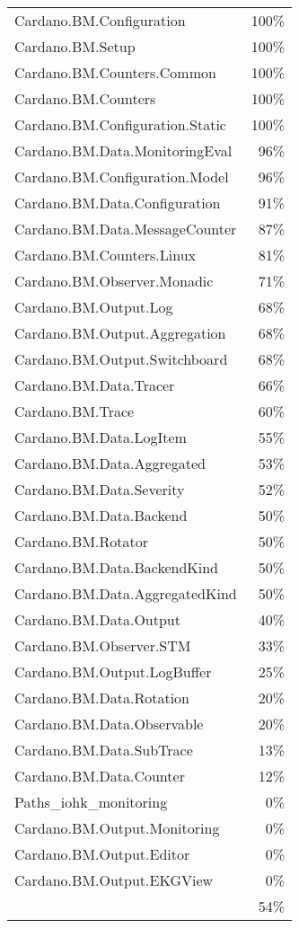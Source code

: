 \begin{tabular}{l r}
   Cardano.BM.Configuration & 100\% \\
   Cardano.BM.Setup & 100\% \\
   Cardano.BM.Counters.Common & 100\% \\
   Cardano.BM.Counters & 100\% \\
   Cardano.BM.Configuration.Static & 100\% \\
   Cardano.BM.Data.MonitoringEval & 96\% \\
   Cardano.BM.Configuration.Model & 96\% \\
   Cardano.BM.Data.Configuration & 91\% \\
   Cardano.BM.Data.MessageCounter & 87\% \\
   Cardano.BM.Counters.Linux & 81\% \\
   Cardano.BM.Observer.Monadic & 71\% \\
   Cardano.BM.Output.Log & 68\% \\
   Cardano.BM.Output.Aggregation & 68\% \\
   Cardano.BM.Output.Switchboard & 68\% \\
   Cardano.BM.Data.Tracer & 66\% \\
   Cardano.BM.Trace & 60\% \\
   Cardano.BM.Data.LogItem & 55\% \\
   Cardano.BM.Data.Aggregated & 53\% \\
   Cardano.BM.Data.Severity & 52\% \\
   Cardano.BM.Data.Backend & 50\% \\
   Cardano.BM.Rotator & 50\% \\
   Cardano.BM.Data.BackendKind & 50\% \\
   Cardano.BM.Data.AggregatedKind & 50\% \\
   Cardano.BM.Data.Output & 40\% \\
   Cardano.BM.Observer.STM & 33\% \\
   Cardano.BM.Output.LogBuffer & 25\% \\
   Cardano.BM.Data.Rotation & 20\% \\
   Cardano.BM.Data.Observable & 20\% \\
   Cardano.BM.Data.SubTrace & 13\% \\
   Cardano.BM.Data.Counter & 12\% \\
   Paths\_iohk\_monitoring & 0\% \\
   Cardano.BM.Output.Monitoring & 0\% \\
   Cardano.BM.Output.Editor & 0\% \\
   Cardano.BM.Output.EKGView & 0\% \\
    & 54\% \\
\end{tabular}
